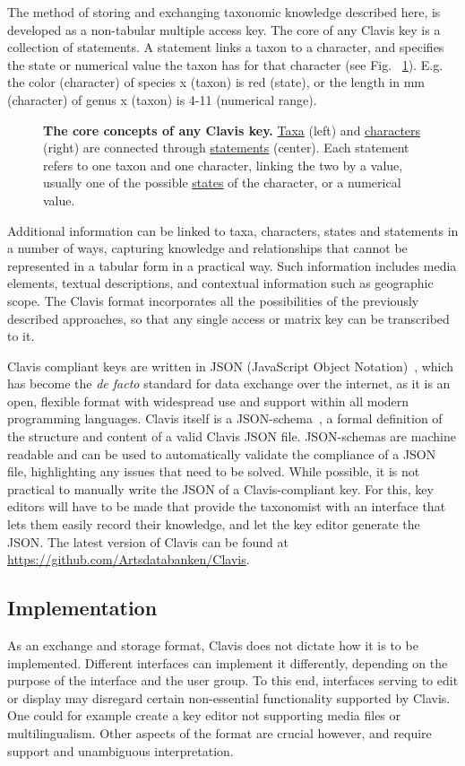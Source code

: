 \documentclass[10pt,letterpaper]{article}
\begin{document}
The method of storing and exchanging taxonomic knowledge described here, is developed as a non-tabular multiple access key. The core of any Clavis key is a collection of statements. A statement links a taxon to a character, and specifies the state or numerical value the taxon has for that character (see Fig. ~\ref{fig1}). E.g. the color (character) of species x (taxon) is red (state), or the length in mm (character) of genus x (taxon) is 4-11 (numerical range).




\begin{figure}[!h]
  \caption{{\bf The core concepts of any Clavis key.}
  \underline{Taxa} (left) and \underline{characters} (right) are connected through \underline{statements} (center). Each statement refers to one taxon and one character, linking the two by a value, usually one of the possible \underline{states} of the character, or a numerical value.}
  \label{fig1}
\end{figure}

Additional information can be linked to taxa, characters, states and statements in a number of ways, capturing knowledge and relationships that cannot be represented in a tabular form in a practical way. Such information includes media elements, textual descriptions, and contextual information such as geographic scope. The Clavis format incorporates all the possibilities of the previously described approaches, so that any single access or matrix key can be transcribed to it.

Clavis compliant keys are written in JSON (JavaScript Object Notation)~\cite{JSON}, which has become the \textit{de facto} standard for data exchange over the internet, as it is an open, flexible format with widespread use and support within all modern programming languages. Clavis itself is a JSON-schema~\cite{JSON_schema}, a formal definition of the structure and content of a valid Clavis JSON file. JSON-schemas are machine readable and can be used to automatically validate the compliance of a JSON file, highlighting any issues that need to be solved. While possible, it is not practical to manually write the JSON of a Clavis-compliant key. For this, key editors will have to be made that provide the taxonomist with an interface that lets them easily record their knowledge, and let the key editor generate the JSON. The latest version of Clavis can be found at \url{https://github.com/Artsdatabanken/Clavis}.

\subsection*{
Implementation
}
As an exchange and storage format, Clavis does not dictate how it is to be implemented. Different interfaces can implement it differently, depending on the purpose of the interface and the user group. To this end, interfaces serving to edit or display may disregard certain non-essential functionality supported by Clavis. One could for example create a key editor not supporting media files or multilingualism. Other aspects of the format are crucial however, and require support and unambiguous interpretation.
\end{document}
